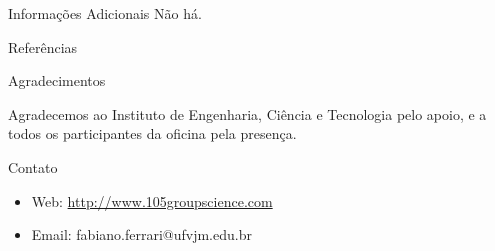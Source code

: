 \documentclass[final]{beamer}
\newlength{\onecolwid}
\begin{document}
\begin{frame}[t]
\begin{columns}[t]
\begin{column}{\onecolwid}
\begin{block}{Informações Adicionais}
Não há.

\end{block}

\vspace{3.0cm}

\begin{block}{Referências}

\nocite{*} %
\small{
\vspace{0.75in}}

\end{block}

\vspace{3.0cm}



\begin{block}{Agradecimentos}

Agradecemos ao Instituto de Engenharia, Ciência e Tecnologia pelo apoio, e a todos os participantes da oficina pela presença.

\end{block}

\vspace{3.0cm}



\begin{alertblock}{Contato}

\begin{itemize}
\item Web: \url{http://www.105groupscience.com}
\item Email: fabiano.ferrari@ufvjm.edu.br
\end{itemize}


\end{alertblock}
\end{column}
\end{columns}
\end{frame}
\end{document}
